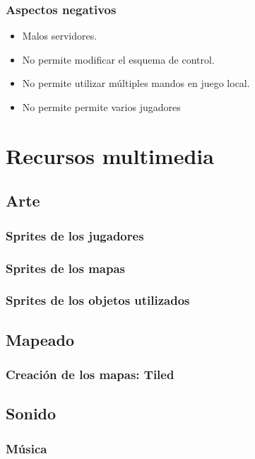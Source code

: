 \documentclass[12pt, spanish]{article}
\begin{document}
\subsubsection{Aspectos negativos}

\begin{itemize}
	\item Malos servidores.
	\item No permite modificar el esquema de control.
	\item No permite utilizar múltiples mandos en juego local.
	\item No permite permite varios jugadores
\end{itemize}

\section{Recursos multimedia}

\subsection{Arte}

\subsubsection{Sprites de los jugadores}

\subsubsection{Sprites de los mapas}

\subsubsection{Sprites de los objetos utilizados}


\subsection{Mapeado}

\subsubsection{Creación de los mapas: Tiled}

\subsection{Sonido}

\subsubsection{Música}
\end{document}
